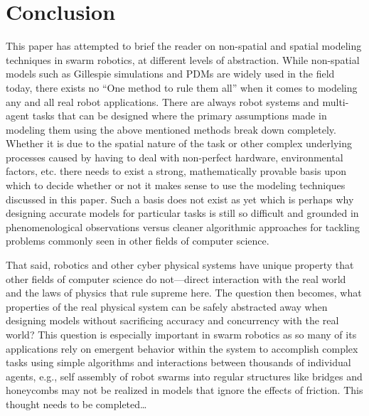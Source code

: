 \documentclass[Main.tex]{subfiles}
\begin{document}
\section{Conclusion}
This paper has attempted to brief the reader on non-spatial and spatial modeling techniques in swarm robotics, at different levels of abstraction. While non-spatial models such as Gillespie simulations and PDMs are widely used in the field today, there exists no ``One method to rule them all'' when it comes to modeling any and all real robot applications. There are always robot systems and multi-agent tasks that can be designed where the primary assumptions made in modeling them using the above mentioned methods break down completely. Whether it is due to the spatial nature of the task or other complex underlying processes caused by having to deal with non-perfect hardware, environmental factors, etc. there needs to exist a strong, mathematically provable basis upon which to decide whether or not it makes sense to use the modeling techniques discussed in this paper. Such a basis does not exist as yet which is perhaps why designing accurate models for particular tasks is still so difficult and grounded in phenomenological observations versus cleaner algorithmic approaches for tackling problems commonly seen in other fields of computer science.

That said, robotics and other cyber physical systems have unique property that other fields of computer science do not---direct interaction with the real world and the laws of physics that rule supreme here. The question then becomes, what properties of the real physical system can be safely abstracted away when designing models without sacrificing accuracy and concurrency with the real world? This question is especially important in swarm robotics as so many of its applications rely on emergent behavior within the system to accomplish complex tasks using simple algorithms and interactions between thousands of individual agents\citep{Hamann2012}, e.g., self assembly of robot swarms into regular structures like bridges and honeycombs may not be realized in models that ignore the effects of friction. This thought needs to be completed\ldots
\end{document}
